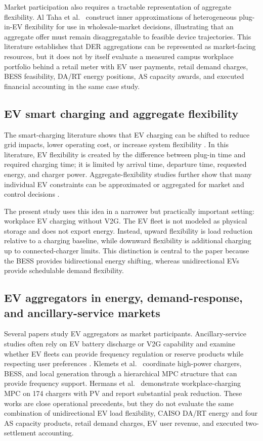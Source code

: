 \documentclass[final,5p,times]{elsarticle}
\begin{document}
Market participation also requires a tractable representation of aggregate flexibility. Al Taha et al.~\cite{alTaha2025aggregateFlex} construct inner approximations of heterogeneous plug-in-EV flexibility for use in wholesale-market decisions, illustrating that an aggregate offer must remain disaggregatable to feasible device trajectories. This literature establishes that DER aggregations can be represented as market-facing resources, but it does not by itself evaluate a measured campus workplace portfolio behind a retail meter with EV user payments, retail demand charges, BESS feasibility, DA/RT energy positions, AS capacity awards, and executed financial accounting in the same case study.

\subsection{EV smart charging and aggregate flexibility}
The smart-charging literature shows that EV charging can be shifted to reduce grid impacts, lower operating cost, or increase system flexibility \cite{clement2010impact,sortomme2011optimal,gan2013optimal,richardson2013electric,mwasilu2014electric}. In this literature, EV flexibility is created by the difference between plug-in time and required charging time; it is limited by arrival time, departure time, requested energy, and charger power. Aggregate-flexibility studies further show that many individual EV constraints can be approximated or aggregated for market and control decisions \cite{alTaha2025aggregateFlex,nazari2022updated}.

The present study uses this idea in a narrower but practically important setting: workplace EV charging without V2G. The EV fleet is not modeled as physical storage and does not export energy. Instead, upward flexibility is load reduction relative to a charging baseline, while downward flexibility is additional charging up to connected-charger limits. This distinction is central to the paper because the BESS provides bidirectional energy shifting, whereas unidirectional EVs provide schedulable demand flexibility.

\subsection{EV aggregators in energy, demand-response, and ancillary-service markets}
Several papers study EV aggregators as market participants. Ancillary-service studies often rely on EV battery discharge or V2G capability and examine whether EV fleets can provide frequency regulation or reserve products while respecting user preferences \cite{clairand2020ancillary,sortomme2012v2gAncillary}. Klemets et al.~\cite{klemets2024charging} coordinate high-power chargers, BESS, and local generation through a hierarchical MPC structure that can provide frequency support. Hermans et al.~\cite{hermans2024implementation} demonstrate workplace-charging MPC on 174 chargers with PV and report substantial peak reduction. These works are close operational precedents, but they do not evaluate the same combination of unidirectional EV load flexibility, CAISO DA/RT energy and four AS capacity products, retail demand charges, EV user revenue, and executed two-settlement accounting.
\end{document}

